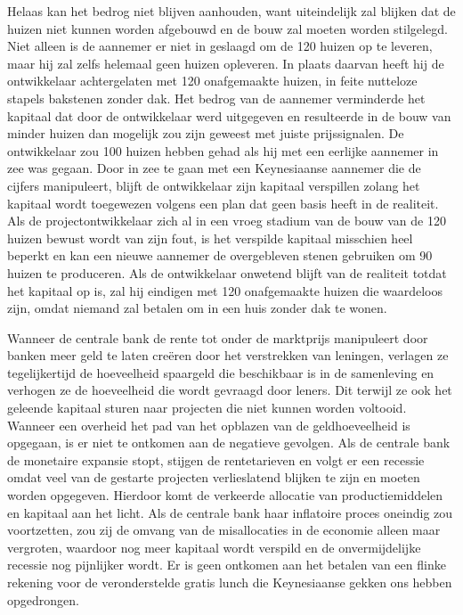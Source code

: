 Helaas kan het bedrog niet blijven aanhouden, want uiteindelijk zal blijken dat de huizen niet kunnen worden afgebouwd en de bouw zal moeten worden stilgelegd. Niet alleen is de aannemer er niet in geslaagd om de 120 huizen op te leveren, maar hij zal zelfs helemaal geen huizen opleveren. In plaats daarvan heeft hij de ontwikkelaar achtergelaten met 120 onafgemaakte huizen, in feite nutteloze stapels bakstenen zonder dak. Het bedrog van de aannemer verminderde het kapitaal dat door de ontwikkelaar werd uitgegeven en resulteerde in de bouw van minder huizen dan mogelijk zou zijn geweest met juiste prijssignalen. De ontwikkelaar zou 100 huizen hebben gehad als hij met een eerlijke aannemer in zee was gegaan. Door in zee te gaan met een Keynesiaanse aannemer die de cijfers manipuleert, blijft de ontwikkelaar zijn kapitaal verspillen zolang het kapitaal wordt toegewezen volgens een plan dat geen basis heeft in de realiteit. Als de projectontwikkelaar zich al in een vroeg stadium van de bouw van de 120 huizen bewust wordt van zijn fout, is het verspilde kapitaal misschien heel beperkt en kan een nieuwe aannemer de overgebleven stenen gebruiken om 90 huizen te produceren. Als de ontwikkelaar onwetend blijft van de realiteit totdat het kapitaal op is, zal hij eindigen met 120 onafgemaakte huizen die waardeloos zijn, omdat niemand zal betalen om in een huis zonder dak te wonen.

Wanneer de centrale bank de rente tot onder de marktprijs manipuleert door banken meer geld te laten creëren door het verstrekken van leningen, verlagen ze tegelijkertijd de hoeveelheid spaargeld die beschikbaar is in de samenleving en verhogen ze de hoeveelheid die wordt gevraagd door leners. Dit terwijl ze ook het geleende kapitaal sturen naar projecten die niet kunnen worden voltooid. Wanneer een overheid het pad van het opblazen van de geldhoeveelheid is opgegaan, is er niet te ontkomen aan de negatieve gevolgen. Als de centrale bank de monetaire expansie stopt, stijgen de rentetarieven en volgt er een recessie omdat veel van de gestarte projecten verlieslatend blijken te zijn en moeten worden opgegeven. Hierdoor komt de verkeerde allocatie van productiemiddelen en kapitaal aan het licht. Als de centrale bank haar inflatoire proces oneindig zou voortzetten, zou zij de omvang van de misallocaties in de economie alleen maar vergroten, waardoor nog meer kapitaal wordt verspild en de onvermijdelijke recessie nog pijnlijker wordt. Er is geen ontkomen aan het betalen van een flinke rekening voor de veronderstelde gratis lunch die Keynesiaanse gekken ons hebben opgedrongen.

